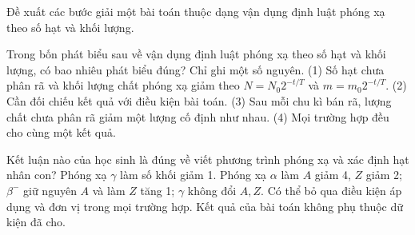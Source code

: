 \begin{bt}
Đề xuất các bước giải một bài toán thuộc dạng vận dụng định luật phóng xạ theo số hạt và khối lượng.
\end{bt}

\begin{ex}
Trong bốn phát biểu sau về vận dụng định luật phóng xạ theo số hạt và khối lượng, có bao nhiêu phát biểu đúng? Chỉ ghi một số nguyên. (1) Số hạt chưa phân rã và khối lượng chất phóng xạ giảm theo $N=N_0 2^{-t/T}$ và $m=m_0 2^{-t/T}$. (2) Cần đối chiếu kết quả với điều kiện bài toán. (3) Sau mỗi chu kì bán rã, lượng chất chưa phân rã giảm một lượng cố định như nhau. (4) Mọi trường hợp đều cho cùng một kết quả.
\end{ex}

\begin{ex}
Kết luận nào của học sinh là đúng về viết phương trình phóng xạ và xác định hạt nhân con?
\choice
{Phóng xạ $\gamma$ làm số khối giảm 1.}
{\True Phóng xạ $\alpha$ làm $A$ giảm 4, $Z$ giảm 2; $\beta^-$ giữ nguyên $A$ và làm $Z$ tăng 1; $\gamma$ không đổi $A,Z$.}
{Có thể bỏ qua điều kiện áp dụng và đơn vị trong mọi trường hợp.}
{Kết quả của bài toán không phụ thuộc dữ kiện đã cho.}
\end{ex}

